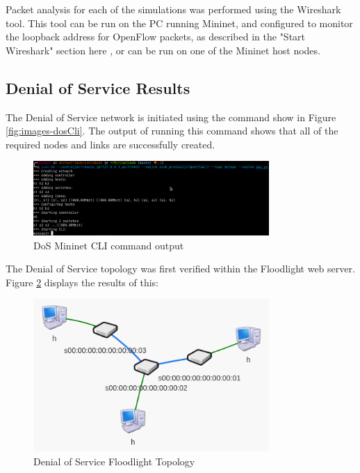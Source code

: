 Packet analysis for each of the simulations was performed using the Wireshark
tool. This tool can be run on the PC running Mininet, and configured to monitor
the loopback address for OpenFlow packets, as described in the "Start Wireshark"
section here \cite{mininetWS}, or can be run on one of the Mininet host nodes.

\subsection{Denial of Service Results}

The Denial of Service network is initiated using the command show in Figure
\ref{fig:images-dosCli}. The output of running this command shows that all of
the required nodes and links are successfully created.

\begin{figure}[H]
	\centering
	\includegraphics[width=0.8\textwidth]{images/dosMnCli}
	\caption{DoS Mininet CLI command output}
	\label{fig:images-dosMnCli}
\end{figure}

The Denial of Service topology was first verified within the Floodlight web
server. Figure \ref{fig:images-flDoS} displays the results of this:

\begin{figure}[H]
	\centering
	\includegraphics[width=0.8\textwidth]{images/flDoS}
	\caption{Denial of Service Floodlight Topology}
	\label{fig:images-flDoS}
\end{figure}

